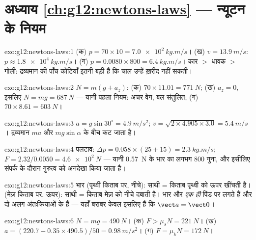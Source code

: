 \section*{अध्याय \ref{ch:g12:newtons-laws} --- न्यूटन के नियम}

\begin{solution}{exo:g12:newtons-laws:1}
(क) $p = 70 \times 10 = \qty{7.0e2}{kg.m/s}$।
(ख) $v = \qty{13.9}{m/s}$: $p \approx \qty{1.8e4}{kg.m/s}$।
(ग) $p = 0.0080 \times 800 = \qty{6.4}{kg.m/s}$। कार $>$ धावक $>$ गोली: द्रव्यमान की पाँच कोटियाँ इतनी बड़ी हैं
कि चाल उन्हें ख़रीद नहीं सकती।
\end{solution}

\begin{solution}{exo:g12:newtons-laws:2}
$N = m(g + a_z)$: (क) $70 \times 11.01 = \qty{771}{N}$; (ख) $a_z = 0$, इसलिए $N = mg = \qty{687}{N}$ --- यानी पहला नियम: अचर वेग,
बल संतुलित; (ग) $70 \times 8.61 = \qty{603}{N}$।
\end{solution}

\begin{solution}{exo:g12:newtons-laws:3}
$a = g\sin 30^\circ = \qty{4.9}{m/s^2}$; $v = \sqrt{2 \times 4.905 \times 3.0} = \qty{5.4}{m/s}$। द्रव्यमान $ma$ और $mg\sin\alpha$ के बीच कट जाता है।
\end{solution}

\begin{solution}{exo:g12:newtons-laws:4}
पलटाव: $\Delta p = 0.058 \times (25 + 15) = \qty{2.3}{kg.m/s}$; $F = 2.32/0.0050 = \qty{4.6e2}{N}$ --- यानी \qty{0.57}{N} के भार का लगभग $800$ गुना, और
इसीलिए संपर्क के दौरान गुरुत्व को अनदेखा किया जाता है।
\end{solution}

\begin{solution}{exo:g12:newtons-laws:5}
भार (पृथ्वी किताब पर, नीचे): साथी = किताब पृथ्वी को ऊपर खींचती है।
 (मेज़ किताब पर, ऊपर): साथी = किताब मेज़ को नीचे दबाती है।
भार और  \emph{एक ही} पिंड पर लगते हैं और दो अलग अंतःक्रियाओं के हैं
--- यहाँ बराबर केवल इसलिए हैं कि $\vect a = \vect 0$।
\end{solution}

\begin{solution}{exo:g12:newtons-laws:6}
$N = mg = \qty{490}{N}$। (क) $F > \mu_s N = \qty{221}{N}$। (ख) $a = (220.7 - 0.35 \times 490.5)/50 = \qty{0.98}{m/s^2}$। (ग) $F = \mu_k N = \qty{172}{N}$।
\end{solution}


